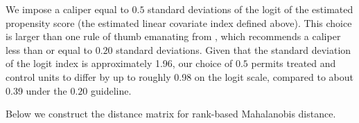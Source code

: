 \documentclass[
  12pt,
  leqno]{article}
\newenvironment{Shaded}{\begin{snugshade}}{\end{snugshade}}
\newcommand{\AttributeTok}[1]{\textcolor[rgb]{0.13,0.29,0.53}{#1}}
\newcommand{\CommentTok}[1]{\textcolor[rgb]{0.56,0.35,0.01}{\textit{#1}}}
\newcommand{\ConstantTok}[1]{\textcolor[rgb]{0.56,0.35,0.01}{#1}}
\newcommand{\DecValTok}[1]{\textcolor[rgb]{0.00,0.00,0.81}{#1}}
\newcommand{\FloatTok}[1]{\textcolor[rgb]{0.00,0.00,0.81}{#1}}
\newcommand{\FunctionTok}[1]{\textcolor[rgb]{0.13,0.29,0.53}{\textbf{#1}}}
\newcommand{\NormalTok}[1]{#1}
\newcommand{\OtherTok}[1]{\textcolor[rgb]{0.56,0.35,0.01}{#1}}
\newcommand{\SpecialCharTok}[1]{\textcolor[rgb]{0.81,0.36,0.00}{\textbf{#1}}}
\newcommand{\StringTok}[1]{\textcolor[rgb]{0.31,0.60,0.02}{#1}}
\begin{document}
We impose a caliper equal to \(0.5\) standard deviations of the logit of
the estimated propensity score (the estimated linear covariate index
defined above). This choice is larger than one rule of thumb emanating
from \citet{cochranrubin1973}, which recommends a caliper less than or
equal to \(0.20\) standard deviations. Given that the standard deviation
of the logit index is approximately 1.96, our choice of \(0.5\) permits
treated and control units to differ by up to roughly 0.98 on the logit
scale, compared to about 0.39 under the \(0.20\) guideline.

\singlespacing

\begin{Shaded}
\end{Shaded}

\doublespacing

Below we construct the distance matrix for rank-based Mahalanobis
distance.

\singlespacing
\end{document}
